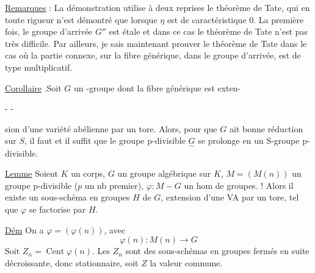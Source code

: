\uline{Remarques} : La démonstration utilise à deux reprises le théorème de Tate, qui en toute rigueur n'est démontré que lorsque $\eta$ est de caractéristique $0$. La première fois, le groupe d'arrivée $G''$ est étale et dans ce cas le théorème de Tate n'est pas très difficile. Par ailleurs, je sais maintenant prouver le théorème de Tate dans le cas où la partie connexe, sur la fibre générique, dans le groupe d'arrivée, est de type multiplicatif.

\uline{Corollaire} .Soit $G$ un \inserted{$\eta$}-groupe  dont la fibre générique est exten-


-  -

sion d'une variété abélienne par un tore. Alors, pour que $G$  ait bonne réduction sur $S$,  il faut et il suffit que le groupe p-divisible $\underset{\sim}{G}$ se prolonge en un S-groupe p-divisible.



\uline{Lemme} Soient $K$ un corps, $G$ un groupe algébrique sur $K$, $M=(M(n))$ un groupe p-divisible ($p$ un nb premier),  $\varphi:M\mathbin{-}G$ un hom de groupes. ! Alors  il existe un sous-schéma en groupes $H$ de $G$, extension d'une VA par un tore, tel que $\varphi$ se factorise par $H$.

\uline{Dém} On a $\varphi=(\varphi(n))$, avec
\[
\varphi(n):M(n)\longrightarrow G
\]
Soit $Z_n=\operatorname{Cent}\varphi(n)$. Les $Z_n$ sont des sous-schémas en groupes fermés en suite décroissante, donc stationnaire, soit $Z$ la valeur commune.

